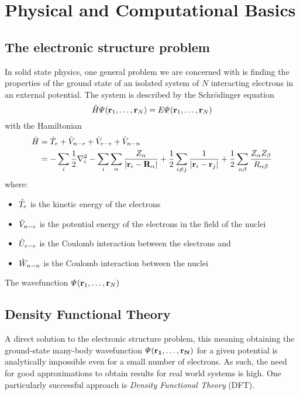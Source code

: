\documentclass[\main/main.tex]{subfiles}
\begin{document}
\chapter{Physical and Computational Basics\label{chap:theory}}

\section{The electronic structure problem\label{sec:theory_schrödinger}}

In solid state physics, one general problem we are concerned with is finding the properties of the ground state of an isolated system of \(N\) interacting electrons in an external potential.
The system is described by the Schrödinger equation
\begin{equation}
    \hat{H} \Psi (\vb{r}_1, \ldots, \vb{r}_N) = E \Psi (\vb{r}_1, \ldots, \vb{r}_N)
\end{equation}
with the Hamiltonian
\begin{align}
    \hat{H} &= \hat{T}_e + \hat{V}_{n-e} + \hat{V}_{e-e} + \hat{V}_{n-n} \\
    &= -\sum_i \frac{1}{2} \nabla^2_i - \sum_i \sum_{\alpha} \frac{Z_{\alpha}}{\vert \vb{r}_i - \vb{R}_{\alpha} \vert} + \frac{1}{2} \sum_{i \neq j} \frac{1}{\vert \vb{r}_i - \vb{r}_j \vert} + \frac{1}{2} \sum_{\alpha \beta} \frac{Z_{\alpha} Z_{\beta}}{R_{\alpha \beta}}
\end{align}
where:
\begin{itemize}
    \item \(\hat{T}_e\) is the kinetic energy of the electrons
    \item \(\hat{V}_{n-e}\) is the potential energy of the electrons in the field of the nuclei
    \item \(\hat{U}_{e-e}\) is the Coulomb interaction between the electrons and
    \item \(\hat{W}_{n-n}\) is the Coulomb interaction between the nuclei
\end{itemize}

The wavefunction \(\Psi (\vb{r}_1, \ldots, \vb{r}_N)\) 


\section{Density Functional Theory\label{sec:theory_dft}}

A direct solution to the electronic structure problem, this meaning obtaining the ground-state many-body wavefunction \(\Psi (\vb{r_1}, \ldots, \vb{r_N})\) for a given potential is analytically impossible even for a small number of electrons. 
As such, the need for good approximations to obtain results for real world
systems is high.
One particularly successful approach is \emph{Density Functional Theory} (DFT).
\end{document}

